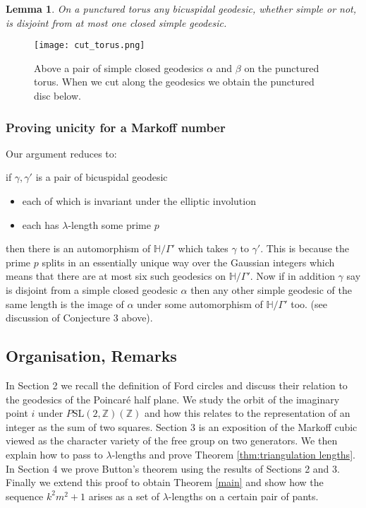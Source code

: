 \documentclass[12pt,a4paper]{amsart}
\newtheorem{lem}[thm]{Lemma}
\def\HH{\mathbb{H}}
\def\xx{\HH/\Gamma'}
\def\ZZ{\mathbb{Z}}
\def\sl2{\mathrm{SL}(2, \ZZ)}
\begin{document}
\begin{lem}\label{lem: labelling}
On a punctured torus any bicuspidal geodesic, whether simple or not, is
disjoint from at most one closed simple geodesic.
\end{lem}

\begin{figure}[ht]
\begin{center}
\texttt{[image: cut\_torus.png]}
\end{center}

\caption{Above a pair of simple closed geodesics $\alpha$ and $\beta$ on the
punctured torus. When we cut along the geodesics we obtain the punctured disc
below.}

	\label{fig: cut torus}
\end{figure}

\subsubsection{Proving unicity for a Markoff number} 
Our argument reduces to:

if $\gamma, \gamma'$ is a pair of  bicuspidal geodesic 

\begin{itemize}	
\item each of which is invariant under the elliptic involution 
\item each has  $\lambda$-length some prime $p$ 
\end{itemize}	

then there is an automorphism of $\xx$ which takes $\gamma$ to $\gamma'$. This
is because  the prime $p$ splits in an essentially unique way over the Gaussian
integers which means that there are at most six such geodesics on $\xx$. Now if
in addition $\gamma$ say is disjoint from a simple closed geodesic $\alpha$ then
any other simple geodesic of the same length is the image of $\alpha$ under
some automorphism of $\xx$ too. (see discussion of Conjecture 3 \cite{mcp}
above).

\subsection{Organisation, Remarks}

In Section 2 we recall the definition of Ford circles and discuss their
relation to the geodesics of the Poincaré half plane. We study the orbit of the
imaginary point $i$ under $P\sl2(\ZZ)$ and how this relates to the
representation of an integer as the sum of two squares. Section 3  is an
exposition of the Markoff cubic viewed as the character variety of the free
group on two generators. We then explain how to pass to $\lambda$-lengths and
prove Theorem \ref{thm:triangulation lengths}. In Section 4 we prove Button's
theorem using the results of Sections 2 and  3.  Finally we extend this proof
to obtain Theorem \ref{main} and show how the sequence $k^2m^2 + 1$ arises as a
set of $\lambda$-lengths on a certain pair of pants.
\end{document}
